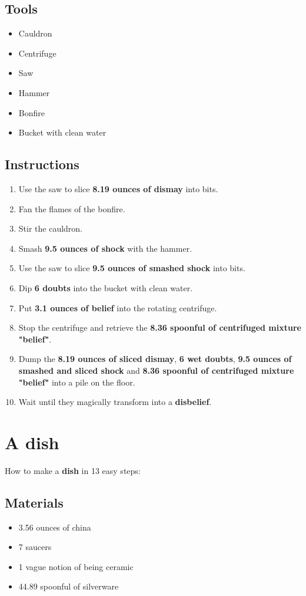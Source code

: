 \documentclass{article}
\begin{document}
\subsection{Tools}\begin{itemize}
\item 
Cauldron
\item 
Centrifuge
\item 
Saw
\item 
Hammer
\item 
Bonfire
\item 
Bucket with clean water
\end{itemize}
\subsection{Instructions}\begin{enumerate}
\item 
Use the saw to slice \textbf{8.19 ounces of dismay} into bits.
\item 
Fan the flames of the bonfire.
\item 
Stir the cauldron.
\item 
Smash \textbf{9.5 ounces of shock} with the hammer.
\item 
Use the saw to slice \textbf{9.5 ounces of smashed shock} into bits.
\item 
Dip \textbf{6 doubts} into the bucket with clean water.
\item 
Put \textbf{3.1 ounces of belief} into the rotating centrifuge.
\item 
Stop the centrifuge and retrieve the \textbf{8.36 spoonful of centrifuged mixture "belief"}.
\item 
Dump the \textbf{8.19 ounces of sliced dismay}, \textbf{6 wet doubts}, \textbf{9.5 ounces of smashed and sliced shock} and \textbf{8.36 spoonful of centrifuged mixture "belief"} into a pile on the floor.
\item 
Wait until they magically transform into a \textbf{disbelief}.
\end{enumerate}
\newpage
\section{A dish}How to make a \textbf{dish} in 13 easy steps:

\subsection{Materials}\begin{itemize}
\item 
3.56 ounces of china
\item 
7 saucers
\item 
1 vague notion of being ceramic
\item 
44.89 spoonful of silverware
\end{itemize}
\end{document}
